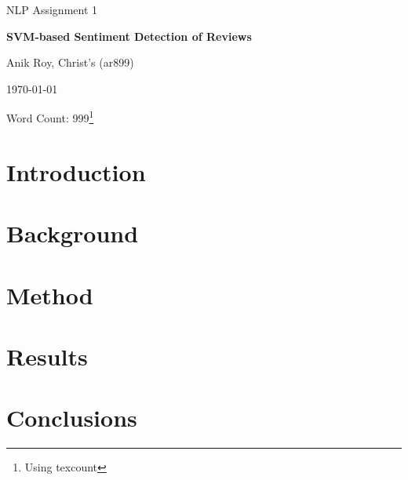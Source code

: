 \documentclass[12pt,a4paper]{article}
\begin{document}
\centerline{\large NLP Assignment 1}
\vspace{0.2in}
\centerline{\Large\bf SVM-based Sentiment Detection of Reviews}
\vspace{0.1in}
\centerline{\large {Anik Roy, Christ's (ar899)}}
\vspace{0.1in}
\centerline{\large {\today}}
\vspace{0.05in}
\centerline{Word Count: 999\footnote{Using texcount}}
\vspace{0.2in}


\begin{multicols}{2}
  
\section{Introduction}
\blindtext
\section{Background}
\blindtext
\section{Method}
\blindtext
\section{Results}
\blindtext
\section{Conclusions}
\blindtext

\end{multicols}

\clearpage


\end{document}
